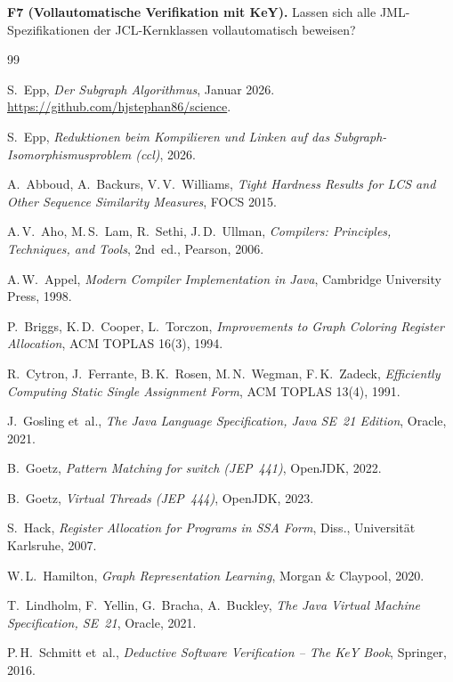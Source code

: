 ﻿\documentclass[a4paper,12pt]{article}
\theoremstyle{definition}
\begin{document}
\textbf{F7 (Vollautomatische Verifikation mit KeY).}
Lassen sich alle JML-Spezifikationen der JCL-Kernklassen
vollautomatisch beweisen?

\begin{thebibliography}{99}

S.~Epp, \textit{Der Subgraph Algorithmus}, Januar 2026.
\url{https://github.com/hjstephan86/science}.

S.~Epp, \textit{Reduktionen beim Kompilieren und Linken auf das
Subgraph-Isomorphismusproblem (ccl)}, 2026.

A.~Abboud, A.~Backurs, V.\,V.~Williams,
\textit{Tight Hardness Results for LCS and Other Sequence Similarity
Measures}, FOCS 2015.

A.\,V.~Aho, M.\,S.~Lam, R.~Sethi, J.\,D.~Ullman,
\textit{Compilers: Principles, Techniques, and Tools}, 2nd~ed.,
Pearson, 2006.

A.\,W.~Appel,
\textit{Modern Compiler Implementation in Java},
Cambridge University Press, 1998.

P.~Briggs, K.\,D.~Cooper, L.~Torczon,
\textit{Improvements to Graph Coloring Register Allocation},
ACM TOPLAS 16(3), 1994.

R.~Cytron, J.~Ferrante, B.\,K.~Rosen, M.\,N.~Wegman,
F.\,K.~Zadeck,
\textit{Efficiently Computing Static Single Assignment Form},
ACM TOPLAS 13(4), 1991.

J.~Gosling et~al.,
\textit{The Java Language Specification, Java SE~21 Edition},
Oracle, 2021.

B.~Goetz,
\textit{Pattern Matching for switch (JEP~441)}, OpenJDK, 2022.

B.~Goetz,
\textit{Virtual Threads (JEP~444)}, OpenJDK, 2023.

S.~Hack,
\textit{Register Allocation for Programs in SSA Form},
Diss., Universit\"at Karlsruhe, 2007.

W.\,L.~Hamilton,
\textit{Graph Representation Learning},
Morgan \& Claypool, 2020.

T.~Lindholm, F.~Yellin, G.~Bracha, A.~Buckley,
\textit{The Java Virtual Machine Specification, SE~21},
Oracle, 2021.

P.\,H.~Schmitt et~al.,
\textit{Deductive Software Verification -- The KeY Book},
Springer, 2016.


\end{thebibliography}
\end{document}
